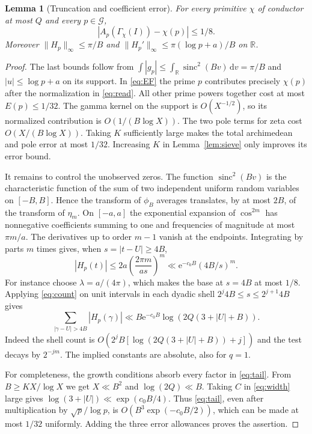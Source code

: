 \documentclass[11pt]{article}
\newtheorem{lemma}[theorem]{Lemma}
\newcommand{\R}{\mathbb R}
\newcommand{\me}{\mathrm e}
\newcommand{\dd}{\,\mathrm d}
\newcommand{\sinc}{\operatorname{sinc}}
\newcommand{\GG}{\mathcal G}
\begin{document}
\begin{lemma}[Truncation and coefficient error]\label{lem:read}
For every primitive $\chi$ of conductor at most $Q$ and every $p\in\GG$,
\[
 |A_p(\Gamma_\chi(I))-\chi(p)|\le 1/8 .
\]
Moreover $\|H_p\|_\infty\le\pi/B$ and $\|H_p'\|_\infty\le\pi(\log p+a)/B$ on $\R$.
\end{lemma}
\begin{proof}
The last bounds follow from $\int|g_p|\le\int_{\R}\sinc^2(Bv)\dd v=\pi/B$ and $|u|\le\log p+a$ on its support. In \eqref{eq:EF} the prime $p$ contributes precisely $\chi(p)$ after the normalization in \eqref{eq:read}. All other prime powers together cost at most $E(p)\le1/32$. The gamma kernel on the support is $O(X^{-1/2})$, so its normalized contribution is $O(1/(B\log X))$. The two pole terms for zeta cost $O(X/(B\log X))$. Taking $K$ sufficiently large makes the total archimedean and pole error at most $1/32$. Increasing $K$ in Lemma~\ref{lem:sieve} only improves its error bound.

It remains to control the unobserved zeros. The function $\sinc^2(Bv)$ is the characteristic function of the sum of two independent uniform random variables on $[-B,B]$. Hence the transform of $\phi_B$ averages translates, by at most $2B$, of the transform of $\eta_m$. On $[-a,a]$ the exponential expansion of $\cos^{2m}$ has nonnegative coefficients summing to one and frequencies of magnitude at most $\pi m/a$. The derivatives up to order $m-1$ vanish at the endpoints. Integrating by parts $m$ times gives, when $s=|t-U|\ge4B$,
\[
 |H_p(t)|\le2a\left(\frac{2\pi m}{as}\right)^m
      \ll \me^{-c_0B}(4B/s)^m.
\]
For instance choose $\lambda=a/(4\pi)$, which makes the base at $s=4B$ at most $1/8$. Applying \eqref{eq:count} on unit intervals in each dyadic shell $2^j4B\le s\le 2^{j+1}4B$ gives
\begin{equation}
 \sum_{|\gamma-U|>4B}|H_p(\gamma)|
 \ll B\me^{-c_0B}\log(2Q(3+|U|+B)).\label{eq:tail}
\end{equation}
Indeed the shell count is $O(2^jB[\log(2Q(3+|U|+B))+j])$ and the test decays by $2^{-jm}$. The implied constants are absolute, also for $q=1$.

For completeness, the growth conditions absorb every factor in \eqref{eq:tail}. From $B\ge K X/\log X$ we get $X\ll B^2$ and $\log(2Q)\ll B$. Taking $C$ in \eqref{eq:width} large gives $\log(3+|U|)\ll\exp(c_0 B/4)$. Thus \eqref{eq:tail}, even after multiplication by $\sqrt p/\log p$, is $O(B^3\exp(-c_0 B/2))$, which can be made at most $1/32$ uniformly. Adding the three error allowances proves the assertion.
\end{proof}
\end{document}
